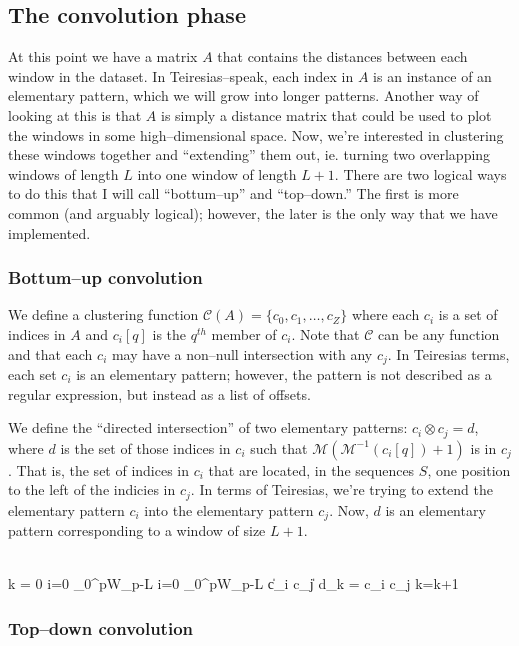     \subsection{The convolution phase}
	At this point we have a matrix $A$ that contains the distances between
	each window in the dataset.  In Teiresias--speak, each index in $A$ is 
	an instance of an elementary pattern, which we will grow into longer
	patterns.  Another way of looking at this is that $A$ is simply a distance
	matrix that could be used to plot the windows in some high--dimensional
	space.  Now, we're interested in clustering these windows together and
	``extending'' them out, ie. turning two overlapping windows of length $L$
	into one window of length $L+1$.  There are two logical ways to do this
	that I will call ``bottum--up'' and ``top--down.''  The first is more 
	common (and arguably logical); however, the later is the only way
	that we have implemented.

	\subsubsection{Bottum--up convolution}
	    We define a clustering function $\mathscr{C}(A) = \{c_0, c_1,\ldots, c_Z\}$
	    where each $c_i$ is a set of indices in $A$ and $c_i[q]$ is the $q^{th}$ member
	    of $c_i$.  Note that $\mathscr{C}$ can
	    be any function and that each $c_i$ may have a non--null intersection with
	    any $c_j$.  In Teiresias terms, each set $c_i$ is an elementary pattern;
	    however, the pattern is not described as a regular expression, but instead
	    as a list of offsets.

	    We define the ``directed intersection'' of two elementary
	    patterns: $c_i \otimes c_j = d$, where $d$ is the
	    set of those indices in $c_i$ such that $\mathscr{M}(
	    \mathscr{M}^{-1}(c_i[q])+1 )$ is in $c_j$.	That is, the set
	    of indices in $c_i$ that are located, in the sequences $S$,
	    one position to the left of the indicies in $c_j$.	In terms
	    of Teiresias, we're trying to extend the elementary pattern
	    $c_i$ into the elementary pattern $c_j$.  Now, $d$ is an
	    elementary pattern corresponding to a window of size $L+1$.

	    \begin{program}
		\BEGIN \\%
		    k = 0
		    \FOR i=0 \TO \sum_{0}^{p}W_p-L  \DO
			\FOR i=0 \TO \sum_{0}^{p}W_p-L  \DO
			    \IF \|c_i \otimes c_j\| 
				d_k = c_i \otimes c_j
				k=k+1
			    \FI
			\OD
		    \OD
		\END
	    \end{program}

	
	\subsubsection{Top--down convolution}
